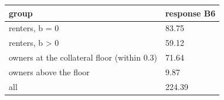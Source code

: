 \begingroup\small
\setlength{\tabcolsep}{3pt}
\renewcommand{\arraystretch}{1.04}
\begin{tabularx}{\linewidth}{XX}
\toprule
group & response B6 \\
\midrule
renters, b = 0 & 83.75 \\
renters, b \textgreater{} 0 & 59.12 \\
owners at the collateral floor (within 0.3) & 71.64 \\
owners above the floor & 9.87 \\
all & 224.39 \\
\bottomrule
\end{tabularx}
\endgroup
